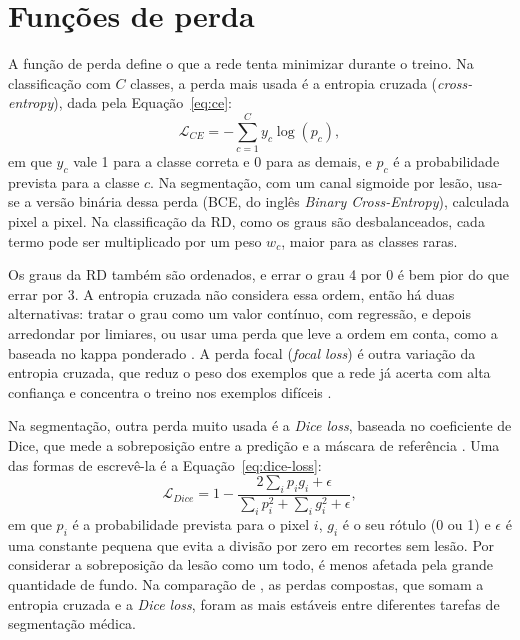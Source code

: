 \section{Funções de perda}
\label{sec:perdas}

A função de perda define o que a rede tenta minimizar durante o treino. Na classificação com $C$ classes, a perda mais usada é a entropia cruzada (\textit{cross-entropy}), dada pela Equação~\ref{eq:ce}:
\begin{equation}
	\label{eq:ce}
	\mathcal{L}_{CE} = -\sum_{c=1}^{C} y_c \log(p_c),
\end{equation}
em que $y_c$ vale 1 para a classe correta e 0 para as demais, e $p_c$ é a probabilidade prevista para a classe $c$. Na segmentação, com um canal sigmoide por lesão, usa-se a versão binária dessa perda (BCE, do inglês \textit{Binary Cross-Entropy}), calculada pixel a pixel. Na classificação da RD, como os graus são desbalanceados, cada termo pode ser multiplicado por um peso $w_c$, maior para as classes raras.

Os graus da RD também são ordenados, e errar o grau 4 por 0 é bem pior do que errar por 3. A entropia cruzada não considera essa ordem, então há duas alternativas: tratar o grau como um valor contínuo, com regressão, e depois arredondar por limiares, ou usar uma perda que leve a ordem em conta, como a baseada no kappa ponderado \cite{delatorre2018kappa}. A perda focal (\textit{focal loss}) é outra variação da entropia cruzada, que reduz o peso dos exemplos que a rede já acerta com alta confiança e concentra o treino nos exemplos difíceis \cite{lin2017focal}.

Na segmentação, outra perda muito usada é a \textit{Dice loss}, baseada no coeficiente de Dice, que mede a sobreposição entre a predição e a máscara de referência \cite{milletari2016vnet}. Uma das formas de escrevê-la é a Equação~\ref{eq:dice-loss}:
\begin{equation}
	\label{eq:dice-loss}
	\mathcal{L}_{Dice} = 1 - \frac{2\sum_{i} p_i g_i + \epsilon}{\sum_{i} p_i^2 + \sum_{i} g_i^2 + \epsilon},
\end{equation}
em que $p_i$ é a probabilidade prevista para o pixel $i$, $g_i$ é o seu rótulo (0 ou 1) e $\epsilon$ é uma constante pequena que evita a divisão por zero em recortes sem lesão. Por considerar a sobreposição da lesão como um todo, é menos afetada pela grande quantidade de fundo. Na comparação de , as perdas compostas, que somam a entropia cruzada e a \textit{Dice loss}, foram as mais estáveis entre diferentes tarefas de segmentação médica.

